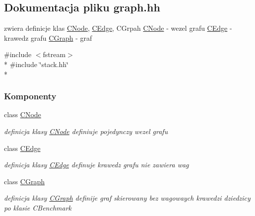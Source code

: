 \hypertarget{graph_8hh}{}\subsection{Dokumentacja pliku graph.\+hh}
\label{graph_8hh}


zwiera definicje klas \hyperlink{class_c_node}{C\+Node}, \hyperlink{class_c_edge}{C\+Edge}, C\+Grpah \hyperlink{class_c_node}{C\+Node} -\/ wezel grafu \hyperlink{class_c_edge}{C\+Edge} -\/ krawedz grafu \hyperlink{class_c_graph}{C\+Graph} -\/ graf  


{\ttfamily \#include $<$fstream$>$}\\*
{\ttfamily \#include \char`\"{}stack.\+hh\char`\"{}}\\*
\subsubsection*{Komponenty}
\begin{DoxyCompactItemize}
\item 
class \hyperlink{class_c_node}{C\+Node}
\begin{DoxyCompactList}\small\item\em definicja klasy \hyperlink{class_c_node}{C\+Node} definiuje pojedynczy wezel grafu \end{DoxyCompactList}\item 
class \hyperlink{class_c_edge}{C\+Edge}
\begin{DoxyCompactList}\small\item\em definicja klasy \hyperlink{class_c_edge}{C\+Edge} definuje krawedz grafu nie zawiera wag \end{DoxyCompactList}\item 
class \hyperlink{class_c_graph}{C\+Graph}
\begin{DoxyCompactList}\small\item\em definicja klasy \hyperlink{class_c_graph}{C\+Graph} definije graf skierowany bez wagowaych krawedzi dziedzicy po klasie C\+Benchmark \end{DoxyCompactList}\end{DoxyCompactItemize}
